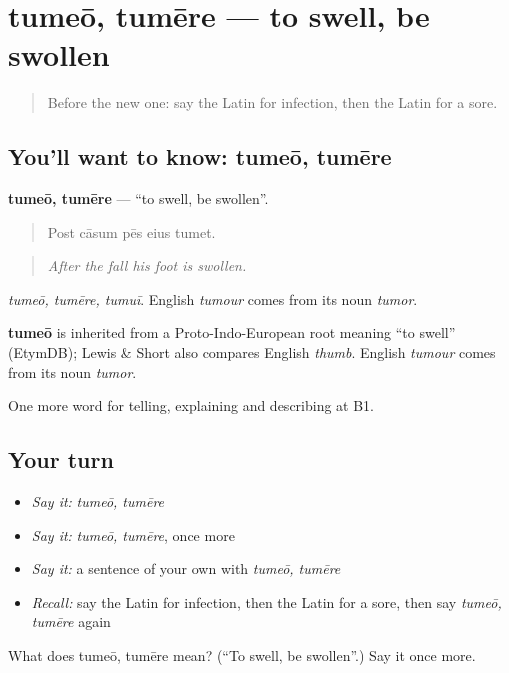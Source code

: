 \section[tumeō, tumēre]{tumeō, tumēre — to swell, be swollen}

\label{lesson:LA-C524-tumeo}



\begin{quote}
Before the new one: say the Latin for infection, then the Latin for a sore.
\end{quote}

\subsection*{You'll want to know: tumeō, tumēre}
\textbf{tumeō, tumēre} — \textquotedblleft{}to swell, be swollen\textquotedblright{}.

\begin{quote}
Post cāsum pēs eius tumet.
\end{quote}

\begin{quote}
\emph{After the fall his foot is swollen.}
\end{quote}

\emph{tumeō, tumēre, tumuī}. English \emph{tumour} comes from its noun \emph{tumor}.

\begin{cousinweb}
\textbf{tumeō} is inherited from a Proto-Indo-European root meaning \textquotedblleft{}to swell\textquotedblright{} (EtymDB); Lewis \& Short also compares English \emph{thumb}. English \emph{tumour} comes from its noun \emph{tumor}.
\end{cousinweb}

\begin{grammarlens}[title={What you've built}]
One more word for telling, explaining and describing at B1.
\end{grammarlens}

\subsection*{Your turn}
\begin{itemize}
\raggedright
  \item \emph{Say it:} \emph{tumeō, tumēre}
  \item \emph{Say it:} \emph{tumeō, tumēre}, once more
  \item \emph{Say it:} a sentence of your own with \emph{tumeō, tumēre}
  \item \emph{Recall:} say the Latin for infection, then the Latin for a sore, then say \emph{tumeō, tumēre} again
\end{itemize}

\begin{tcolorbox}[breakable,colback=teal!4,colframe=teal!35!black,title={Before you move on}]
What does tumeō, tumēre mean? (\textquotedblleft{}To swell, be swollen\textquotedblright{}.) Say it once more.
\end{tcolorbox}
